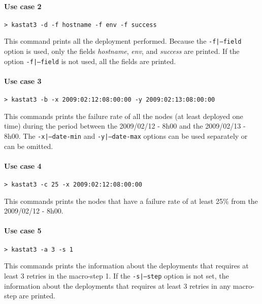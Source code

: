 \documentclass[a4wide,10pt,oneside]{book}
\begin{document}
\paragraph{Use case 2}
\begin{verbatim}
> kastat3 -d -f hostname -f env -f success
\end{verbatim}
This command prints all the deployment performed. Because the \texttt{-f|--field} option is used, only the fields \textit{hostname}, \textit{env}, and \textit{success} are printed. If the option \texttt{-f|--field} is not used, all the fields are printed.

\paragraph{Use case 3}
\begin{verbatim}
> kastat3 -b -x 2009:02:12:08:00:00 -y 2009:02:13:08:00:00
\end{verbatim}
This commands prints the failure rate of all the nodes (at least deployed one time) during the period between the 2009/02/12 - 8h00 and the 2009/02/13 - 8h00. The \texttt{-x|--date-min} and \texttt{-y|--date-max} options can be used separately or can be omitted.

\paragraph{Use case 4}
\begin{verbatim}
> kastat3 -c 25 -x 2009:02:12:08:00:00
\end{verbatim}
This commands prints the nodes that have a failure rate of at least 25\% from the 2009/02/12 - 8h00.

\paragraph{Use case 5}
\begin{verbatim}
> kastat3 -a 3 -s 1
\end{verbatim}
This commands prints the information about the deployments that requires at least 3 retries in the macro-step 1. If the \texttt{-s|--step} option is not set, the information about the deployments that requires at least 3 retries in any macro-step are printed.
\end{document}
